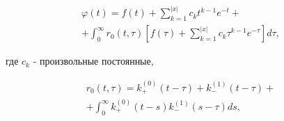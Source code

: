 \documentclass[10pt]{article}
\begin{document}
\[

\begin{gathered}

\varphi(t)=f(t)+\sum_{k=1}^{|x|} c_{k} t^{k-1} e^{-t}+ \\

+\int_{0}^{\infty} r_{0}(t, \tau)\left[f(\tau)+\sum_{k=1}^{|x|} c_{k} \tau^{k-1} e^{-\tau}\right] d \tau,

\end{gathered}

\]



где $c_{k}$ - произвольные постоянные,



\[

\begin{gathered}

r_{0}(t, \tau)=k_{+}^{(0)}(t-\tau)+k_{-}^{(1)}(t-\tau)+ \\

+\int_{0}^{\infty} k_{+}^{(0)}(t-s) k_{-}^{(1)}(s-\tau) d s,

\end{gathered}

\]
\end{document}

